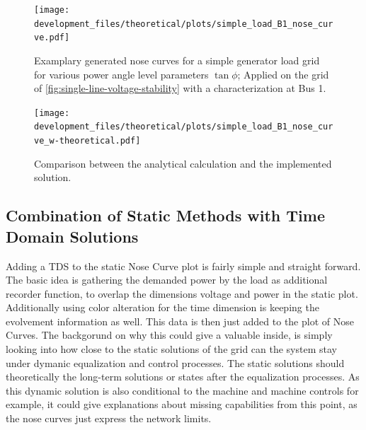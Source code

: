 \begin{figure}[htbp!]
        \centering
        \texttt{[image: development\_files/theoretical/plots/simple\_load\_B1\_nose\_curve.pdf]}
        \caption[Examplary generated nose curve for a simple generator - load grid]{Examplary generated nose curves for a simple generator load grid for various power angle level parameters $\tan \phi$; Applied on the grid of \autoref{fig:single-line-voltage-stability} with a characterization at Bus 1.}
        \label{fig:nose-curve-simple-grid}
\end{figure}

\begin{figure}[htbp!]
        \centering
        \texttt{[image: development\_files/theoretical/plots/simple\_load\_B1\_nose\_curve\_w-theoretical.pdf]}
        \caption[Comparison between the analytical calculation and the implemented solution]{Comparison between the analytical calculation and the implemented solution.}
        \label{fig:nose-curve-simple-comp}
\end{figure}


\subsection{Combination of Static Methods with Time Domain Solutions}
\label{sec:comb-time-dimension}

Adding a \acs{TDS} to the static Nose Curve plot is fairly simple and straight forward.
The basic idea is gathering the demanded power by the load as additional recorder function, to overlap the dimensions voltage and power in the static plot.
Additionally using color alteration for the time dimension is keeping the evolvement information as well.
This data is then just added to the plot of Nose Curves.
The backgorund on why this could give a valuable inside, is simply looking into how close to the static solutions of the grid can the system stay under dymanic equalization and control processes.
The static solutions should theoretically the long-term solutions or states after the equalization processes.
As this dynamic solution is also conditional to the machine and machine controls for example, it could give explanations about missing capabilities from this point, as the nose curves just express the network limits.

